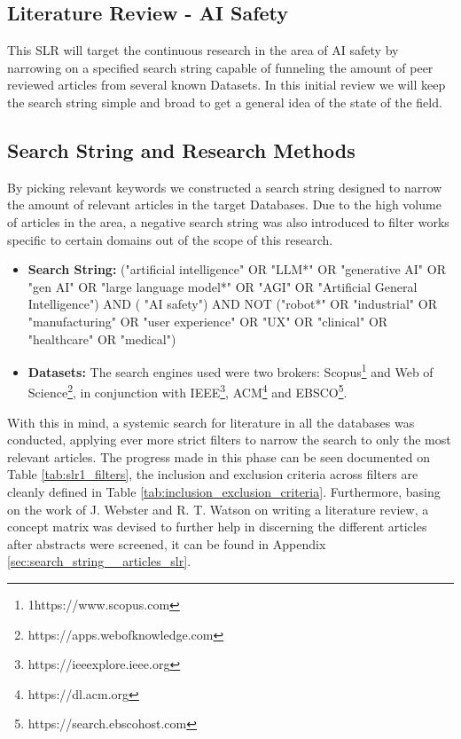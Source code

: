 \begin{toreview}

	\chapter{Literature Review - AI Safety}\label{chap:literature_review}

	This SLR will target the continuous research in the area of AI safety by narrowing on a specified search string capable of funneling the amount of peer reviewed articles from several known Datasets. In this initial review we will keep the search string simple and broad to get a general idea of the state of the field.

	\section{Search String and Research Methods}

	By picking relevant keywords we constructed a search string designed to narrow the amount of relevant articles in the target Databases. Due to the high volume of articles in the area, a negative search string was also introduced to filter works specific to certain domains out of the scope of this research.

	\begin{itemize}
		\item \textbf{Search String:} ("artificial intelligence" OR "LLM*" OR "generative AI" OR "gen AI" OR "large language model*" OR "AGI" OR "Artificial General Intelligence") AND ( "AI safety") AND NOT ("robot*" OR "industrial" OR "manufacturing" OR "user experience" OR "UX" OR "clinical" OR "healthcare" OR "medical")
		\item \textbf{Datasets:} The search engines used were two brokers: Scopus\footnote{1https://www.scopus.com} and Web of Science\footnote{https://apps.webofknowledge.com}, in conjunction with IEEE\footnote{https://ieeexplore.ieee.org}, ACM\footnote{https://dl.acm.org} and EBSCO\footnote{https://search.ebscohost.com}.
	\end{itemize}

	With this in mind, a systemic search for literature in all the databases was conducted, applying ever more strict filters to narrow the search to only the most relevant articles. The progress made in this phase can be seen documented on Table \ref{tab:slr1_filters}, the inclusion and exclusion criteria across filters are cleanly defined in Table \ref{tab:inclusion_exclusion_criteria}. Furthermore, basing on the work of J. Webster and R. T. Watson on writing a literature review\cite{webster_analyzing_2002}, a concept matrix was devised to further help in discerning the different articles after abstracts were screened, it can be found in Appendix \ref{sec:search_string__articles_slr}.


\end{toreview}

